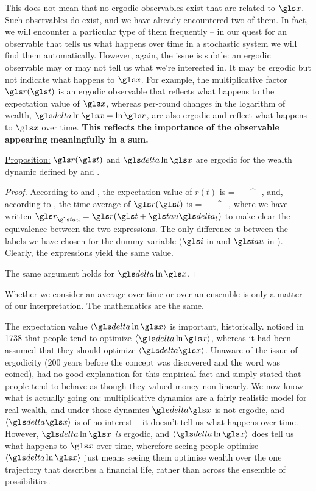 This does not mean that no ergodic observables exist that are related to $\x$. Such observables do exist, and we have already encountered two of them. In fact, we will encounter a particular type
of them frequently -- in our quest for an observable that tells us what happens over time in a stochastic system we will find them automatically. However, again, the issue is subtle: an ergodic observable may or may not tell  us what we're interested in. It may be ergodic but not indicate what happens to $\x$. For example, the multiplicative factor $\gr(\t)$ is an ergodic observable that reflects what happens to the expectation value of $\x$, whereas per-round changes in the logarithm of wealth, $\d \ln \x = \ln \gr$, are also ergodic and reflect what happens to $\x$ over time. \textbf{This reflects the importance of the observable appearing meaningfully in a sum.}

\vspace{.3cm}
\underline{Proposition:} $\gr(\t)$ and $\d \ln \x$  are ergodic for the wealth dynamic defined by  and .

\begin{proof}
According to  and , the expectation value of $r(t)$ is
\be
\ave{\gr}=\lim_{\N\to\infty}  \sum_\gi^\N \gr_\gi,
\ee
and, according to , the time average of $\gr(\t)$ is
\be
\tave{\gr}=\lim_{\T\to\infty}  \sum_\gtau^\T \gr_\gtau,
\ee
where we have written $\gr_\gtau = \gr(\t+\gtau\dt)$ to make clear the equivalence between the two expressions. The only difference is between the labels we have chosen for the dummy variable ($\gi$ in  and $\gtau$ in ). Clearly, the expressions yield the same value. 

The same argument holds for $\d \ln \x$.
\end{proof}

Whether we consider  an average over time or over an ensemble is only a matter of our interpretation. The mathematics are the same.

The expectation value $\ave{\d \ln \x}$ is important, historically.  noticed in 1738 \cite{Bernoulli1738} that people tend to optimize $\ave{\d \ln \x}$, whereas it had been assumed that they should optimize $\ave{\d \x}$. Unaware of the issue of ergodicity (200 years before the concept was discovered and the word was coined),  had no good explanation for this empirical fact and simply stated that people tend to behave as though they valued money non-linearly. We now know what is actually going on: multiplicative dynamics are a fairly realistic model for real wealth, and under those dynamics $\d \x$ is not ergodic, and $\ave{\d \x}$ is of no interest -- it doesn't tell us what happens over time. However, $\d \ln \x$ {\it is} ergodic, and $\ave{\d \ln \x}$ does tell us what happens to $\x$ over time, wherefore seeing people optimise $\ave{\d \ln \x}$ just means seeing them optimise wealth over the one trajectory that describes a financial life, rather than across the ensemble of possibilities.

